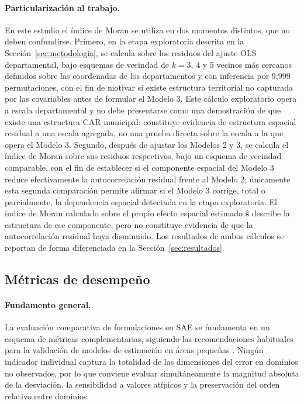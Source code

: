 \paragraph{Particularización al trabajo.}
En este estudio el índice de Moran se utiliza en dos momentos distintos, que no deben confundirse. Primero, en la etapa exploratoria descrita en la Sección~\ref{sec:metodologia}, se calcula sobre los residuos del ajuste OLS departamental, bajo esquemas de vecindad de $k=3$, 4 y 5 vecinos más cercanos definidos sobre las coordenadas de los departamentos y con inferencia por 9{,}999 permutaciones, con el fin de motivar si existe estructura territorial no capturada por las covariables antes de formular el Modelo 3. Este cálculo exploratorio opera a escala departamental y no debe presentarse como una demostración de que existe una estructura CAR municipal: constituye evidencia de estructura espacial residual a una escala agregada, no una prueba directa sobre la escala a la que opera el Modelo 3. Segundo, después de ajustar los Modelos 2 y 3, se calcula el índice de Moran sobre sus residuos respectivos, bajo un esquema de vecindad comparable, con el fin de establecer si el componente espacial del Modelo 3 reduce efectivamente la autocorrelación residual frente al Modelo 2; únicamente esta segunda comparación permite afirmar si el Modelo 3 corrige, total o parcialmente, la dependencia espacial detectada en la etapa exploratoria. El índice de Moran calculado sobre el propio efecto espacial estimado $\hat{\mathbf{s}}$ describe la estructura de ese componente, pero no constituye evidencia de que la autocorrelación residual haya disminuido. Los resultados de ambos cálculos se reportan de forma diferenciada en la Sección~\ref{sec:resultados}.

\subsection{Métricas de desempeño}
\label{subsec:metricas}

\paragraph{Fundamento general.}
La evaluación comparativa de formulaciones en SAE se fundamenta en un esquema de métricas complementarias, siguiendo las recomendaciones habituales para la validación de modelos de estimación en áreas pequeñas \cite{RaoMolina_2015}. Ningún indicador individual captura la totalidad de las dimensiones del error en dominios no observados, por lo que conviene evaluar simultáneamente la magnitud absoluta de la desviación, la sensibilidad a valores atípicos y la preservación del orden relativo entre dominios.

